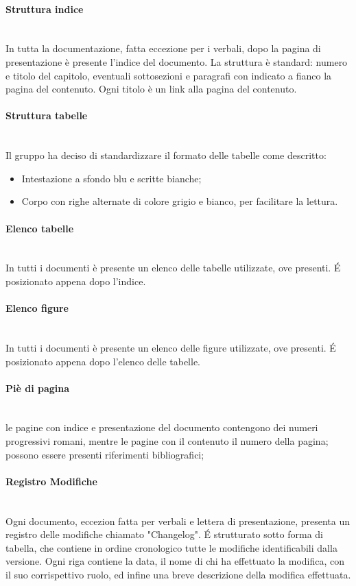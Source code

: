 \paragraph{Struttura indice} \-\\
In tutta la documentazione, fatta eccezione per i verbali, dopo la pagina di presentazione è presente l'indice del documento. La struttura è standard: numero e titolo del capitolo, eventuali sottosezioni e paragrafi con indicato a fianco la pagina del contenuto. Ogni titolo è un link alla pagina del contenuto. 

\paragraph{Struttura tabelle} \-\\
Il gruppo ha deciso di standardizzare il formato delle tabelle come descritto:
\begin{itemize}
	\item Intestazione a sfondo blu e scritte bianche;
	\item Corpo con righe alternate di colore grigio e bianco, per facilitare la lettura.
\end{itemize}

\paragraph{Elenco tabelle} \-\\
In tutti i documenti è presente un elenco delle tabelle utilizzate, ove presenti. \'E posizionato appena dopo l'indice.  

\paragraph{Elenco figure} \-\\
In tutti i documenti è presente un elenco delle figure utilizzate, ove presenti. \'E posizionato appena dopo l'elenco delle tabelle.

\paragraph{Piè di pagina} \-\\ le pagine con indice e presentazione del documento contengono dei numeri progressivi romani, mentre le pagine con il contenuto il numero della pagina; possono essere presenti riferimenti bibliografici;

\paragraph{Registro Modifiche} \-\\
Ogni documento, eccezion fatta per verbali e lettera di presentazione, presenta un registro delle modifiche chiamato "Changelog". \'E strutturato sotto forma di tabella, che contiene in ordine cronologico tutte le modifiche identificabili dalla versione.  Ogni riga contiene la data, il nome di chi ha effettuato la modifica, con il suo corrispettivo ruolo, ed infine una breve descrizione della modifica effettuata.

